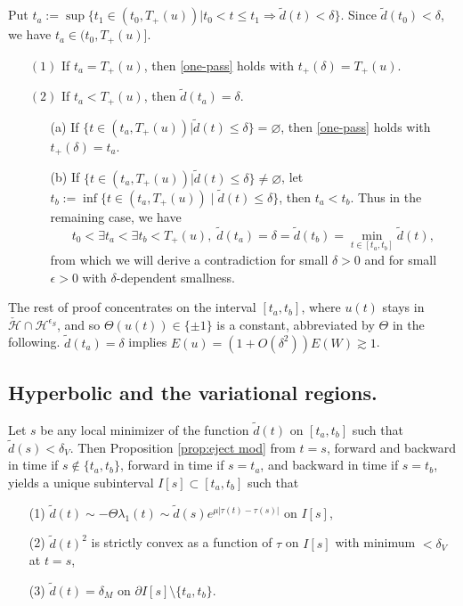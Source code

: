 \documentclass[reqno, 11pt]{amsart}
\numberwithin{equation}{section}
\theoremstyle{plain}
\theoremstyle{definition}
\numberwithin{equation}{section}
\numberwithin{theorem}{section}
\numberwithin{equation}{section}
\numberwithin{equation}{section}
\numberwithin{theorem}{section}
\begin{document}
	Put $t_{a}:=\sup\{t_{1}\in (t_0,T_{+}(u))| t_0<t\leq t_1 \Longrightarrow \widetilde{d}(t)<\delta \}$. Since $\widetilde{d}(t_0)<\delta$, we have $t_{a}\in (t_0,T_{+}(u)]$.
	\begin{enumerate}
		\item[$(1)$] If $t_{a}=T_{+}(u)$, then \eqref{one-pass} holds with $t_{+}(\delta)=T_{+}(u)$. 
		\item[$(2)$] If $t_{a}<T_{+}(u)$, then $\widetilde{d}(t_{a})=\delta$.
		\begin{enumerate}
			\item[(a)] If $\{t\in (t_a,T_{+}(u))|\widetilde{d}(t)\leq \delta\}=\varnothing$, then \eqref{one-pass} holds with $t_{+}(\delta)=t_a$. 
			\item[(b)]  If $\{t\in (t_a,T_{+}(u))|\widetilde{d}(t)\leq \delta\} \neq \varnothing$, let $t_{b}:=\inf\{t\in (t_a,T_{+}(u))\;|\;\widetilde{d}(t)\leq\delta \}$, then $t_{a}<t_{b}$. Thus in the remaining case, we have
			\begin{equation*}
			t_{0}<\exists t_{a}<\exists t_{b}<T_{+}(u),\; \widetilde{d}(t_{a})=\delta=\widetilde{d}(t_{b})=\min_{t\in \left[t_{a},t_{b}\right]} \widetilde{d}(t),
			\end{equation*}
			from which we will derive a contradiction for small $\delta>0$ and for small $\epsilon>0$ with $\delta$-dependent smallness.
		\end{enumerate}
	\end{enumerate}
	
	The rest of proof concentrates on the interval  $\left[t_{a},t_{b}\right]$, where $u(t)$ stays in $\check{\mathcal{H}}\cap \mathcal{H}^{\epsilon_S}$, and so $\Theta(u(t))\in \{\pm1\}$ is a constant, abbreviated by $\Theta$ in the following. $\widetilde{d}(t_{a})=\delta$ implies $E(u)=\left(1+O(\delta^2)\right)E(W) \gtrsim 1$.
	
	
	
	\subsection{Hyperbolic and the variational regions.} Let $s$ be any local minimizer of the function $\widetilde{d}(t)$ on $\left[t_{a},t_{b}\right]$ such that $\widetilde{d}(s)<\delta_{V}$. Then Proposition \ref{prop:eject mod} from $t=s$, forward and backward in time if $s\notin \{t_{a},t_{b}\}$, forward in time if $s=t_{a}$, and backward in time if $s=t_{b}$, yields a unique subinterval $I[s]\subset \left[t_{a},t_{b}\right]$ such that
	\begin{enumerate}
		\item[(1)] $\widetilde{d}(t)\sim -\Theta\lambda_{1}(t) \sim \widetilde{d}(s)e^{\mu|\tau(t)-\tau(s)|}$ on $I[s]$, 
		\item[(2)] $\widetilde{d}(t)^2$ is strictly convex as a function of $\tau$ on $I[s]$ with minimum $<\delta_{V}$ at $t=s$,
		\item[(3)] $\widetilde{d}(t)=\delta_{M}$ on $\partial I[s]\setminus \{t_{a},t_{b}\}$.	
	\end{enumerate}
	
\end{document}
